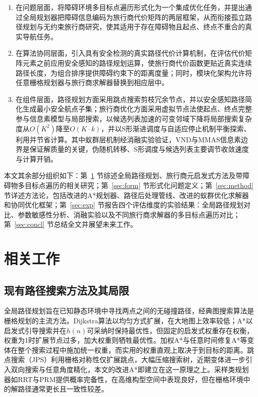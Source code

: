 \documentclass[lettersize,journal]{IEEEtran}
\begin{document}
\begin{enumerate}

\item 在问题层面，将障碍环境多目标点遍历形式化为一个集成优化任务，并提出通过全局规划器把障碍信息编码为旅行商代价矩阵的两层框架，从而衔接孤立路径规划与无约束旅行商研究，使其适用于存在障碍物且起点、终点不重合的真实导航任务。

\item 在算法协同层面，引入具有安全检测的真实路径代价计算机制，在评估代价矩阵元素之前应用安全感知的路径规划运算，使旅行商代价函数更贴近真实连续路径长度，为组合排序提供障碍约束下的距离度量；同时，模块化架构允许将任意栅格规划器与旅行商求解器替换到相应层中。

\item 在组件层面，路径规划方面采用跳点搜索剪枝冗余节点，并以安全感知路径简化生成最小安全航点子集；旅行商优化方面采用虚拟节点法使起点、终点完整参与信息素模型与局部搜索，以候选列表加速的可变邻域下降将局部搜索复杂度从$O(K^2)$降至$O(K \cdot k)$，并以S形渐进调度与自适应停止机制平衡探索、利用并节省计算。其中蚁群层机制经消融实验验证，VND与MMAS信息素边界是保证解质量的关键，伪随机转移、S形调度与候选列表主要调节收敛速度与计算开销。

\end{enumerate}

本文其余部分组织如下：第~\textcolor{blue}{\ref{sec:related}} 节综述全局路径规划、旅行商元启发式方法及带障碍物多目标点遍历的相关研究；第~\textcolor{blue}{\ref{sec:form}} 节形式化问题定义；第~\textcolor{blue}{\ref{sec:method}} 节详述方法论，包括改进的A*规划器、路径后处理管线、改进的蚁群优化求解器和协同优化框架；第~\textcolor{blue}{\ref{sec:exp}} 节报告四个评估维度的实验结果：全局路径规划对比、参数敏感性分析、消融实验以及不同旅行商求解器的多目标点遍历对比；第~\textcolor{blue}{\ref{sec:concl}} 节总结全文并展望未来工作。

\section{相关工作}

\label{sec:related}

\subsection{现有路径搜索方法及其局限}

全局路径规划旨在已知静态环境中寻找两点之间的无碰撞路径，经典图搜索算法是栅格规划的主流方法\textcolor{blue}{\cite{ref33,ref34,ref35}}。Dijkstra算法以均匀方式扩展，在大地图上效率较低\textcolor{blue}{\cite{ref6}}；A*以启发式引导搜索并在$h(n)$可采纳时保持最优性\textcolor{blue}{\cite{ref5}}，但固定的启发式权重存在权衡，权重为1时扩展节点过多，加大权重则牺牲最优性\textcolor{blue}{\cite{ref8}}。加权A*与任意时间修复A*等变体在整个搜索过程中施加统一权重\textcolor{blue}{\cite{ref8,ref10}}，而实用的权重直观上取决于到目标的距离。跳点搜索（JPS）利用栅格对称性仅扩展跳点，大幅压缩搜索树\textcolor{blue}{\cite{ref11,ref12,ref44}}，近期变体进一步引入双向搜索与任意角度精化\textcolor{blue}{\cite{ref13,ref14,ref15}}，本文的改进A*即建立在这一原理之上。采样类规划器如RRT\textcolor{blue}{\cite{ref7}}与PRM提供概率完备性，在高维构型空间中表现良好，但在栅格环境中的解路径通常更长且一致性较差。
\end{document}

